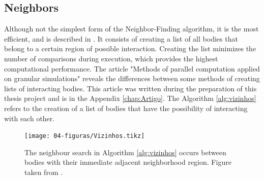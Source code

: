 \subsection{Neighbors}

    Although not the simplest form of the Neighbor-Finding algorithm, it is the most efficient, and is described in \cite{Dissertacao}. It consists of creating a list of all bodies that belong to a certain region of possible interaction. Creating the list minimizes the number of comparisons during execution, which provides the highest computational performance. The article "Methods of parallel computation applied on granular simulations" \cite{Methods_of_Parallel_Computation_Applied_on_Granular_Simulations} reveals the differences between some methods of creating lists of interacting bodies. This article was written during the preparation of this thesis project and is in the Appendix \ref{chap:Artigo}. The Algorithm \ref{alg:vizinhos} refers to the creation of a list of bodies that have the possibility of interacting with each other.



\begin{figure}
    \centering
    \texttt{[image: 04-figuras/Vizinhos.tikz]}
    \caption[Neighbor search.]{The neighbour search in Algorithm \ref{alg:vizinhos} occurs between bodies with their immediate adjacent neighborhood region. Figure taken from \cite{Dissertacao}.}
    \label{fig:vizinhos}
\end{figure}


